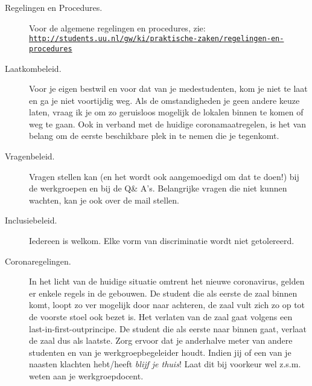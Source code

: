 \begin{description}

  \item[Regelingen en Procedures.]
    Voor de algemene regelingen en procedures, zie:
    \href{http://students.uu.nl/gw/ki/praktische-zaken/regelingen-en-procedures}{\texttt{http://students.uu.nl/gw/ki/praktische-zaken/regelingen-en-procedures}}

  \item[Laatkombeleid.]
    Voor je eigen bestwil en voor dat van je medestudenten, kom je niet te laat en ga je niet voortijdig weg.
    Als de omstandigheden je geen andere keuze laten, vraag ik je om zo geruisloos mogelijk de lokalen binnen te komen of weg te gaan.
    Ook in verband met de huidige coronamaatregelen, is het van belang om de eerste beschikbare plek in te nemen die je tegenkomt.


  \item[Vragenbeleid.]
    Vragen stellen kan (en het wordt ook aangemoedigd om dat te doen!) bij de werkgroepen en bij de Q\& A's.
    Belangrijke vragen die niet kunnen wachten, kan je ook over de mail stellen.

  \item[Inclusiebeleid.]
    Iedereen is welkom. Elke vorm van discriminatie wordt niet getolereerd.

  \item[Coronaregelingen.]
    In het licht van de huidige situatie omtrent het nieuwe coronavirus, gelden er enkele regels in de gebouwen.
    De student die als eerste de zaal binnen komt, loopt zo ver mogelijk door naar achteren, de zaal vult zich zo op tot de voorste stoel ook bezet is.
    Het verlaten van de zaal gaat volgens een last-in-first-outprincipe.
    De student die als eerste naar binnen gaat, verlaat de zaal dus als laatste.
    Zorg ervoor dat je anderhalve meter van andere studenten en van je werkgroepbegeleider houdt.
    Indien jij of een van je naasten klachten hebt/heeft \emph{blijf je thuis}! Laat dit bij voorkeur wel z.s.m. weten aan je werkgroepdocent.

\end{description}
    


